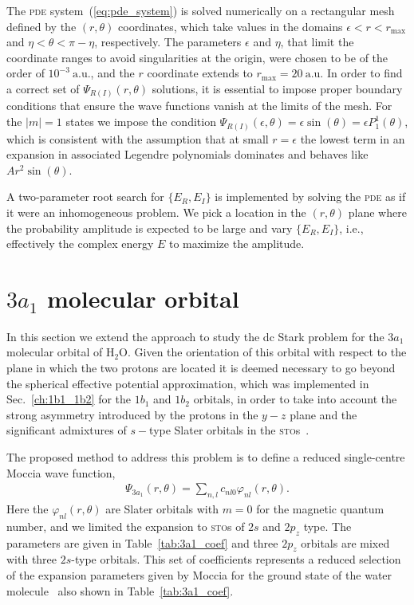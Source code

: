 The \textsc{pde} system~(\ref{eq:pde_system}) is solved numerically on
a rectangular mesh defined by the $(r, \theta)$ coordinates, which
take values in the domains $\epsilon < r < r_{\mathrm{max}}$ and $\eta
< \theta < \pi - \eta$, respectively. The parameters $\epsilon$ and
$\eta$, that limit the coordinate ranges to avoid singularities at the
origin, were chosen to be of the order of $10^{-3}\ \mathrm{a.u.}$,
and the $r$ coordinate extends to $r_{\mathrm{max}} =
20\ \mathrm{a.u.}$ In order to find a correct set of
$\Psi_{R(I)}(r,\theta)$ solutions, it is essential to impose proper
boundary conditions that ensure the wave functions vanish at the
limits of the mesh. For the $|m| = 1$ states we impose the condition
$\Psi_{R(I)}(\epsilon,\theta) = \epsilon \sin(\theta) = \epsilon
P_{1}^{1}(\theta)$, which is consistent with the assumption that at
small $r = \epsilon$ the lowest term in an expansion in associated
Legendre polynomials dominates and behaves like $A r^{2}
\sin(\theta)$.

A two-parameter root search for $\{E_{R}, E_{I}\}$ is implemented by
solving the \textsc{pde} as if it were an inhomogeneous problem. We
pick a location in the $(r,\theta)$ plane where the probability
amplitude is expected to be large and vary $\{E_{R}, E_{I}\}$, i.e.,
effectively the complex energy $E$ to maximize the amplitude.


\section{$3a_{1}$ molecular orbital}
\label{ch:3a1}

In this section we extend the approach to study the dc Stark problem
for the $3a_{1}$ molecular orbital of H$_{2}$O. Given the orientation
of this orbital with respect to the plane in which the two protons are
located it is deemed necessary to go beyond the spherical effective
potential approximation, which was implemented in
Sec.~\ref{ch:1b1_1b2} for the $1b_{1}$ and $1b_{2}$ orbitals, in order
to take into account the strong asymmetry introduced by the protons in
the $y-z$ plane and the significant admixtures of $s-$type Slater
orbitals in the \textsc{sto}s~\cite{Moccia_1964}.

The proposed method to address this problem is to define a reduced
single-centre Moccia wave function,
%
\begin{eqnarray}
\Psi_{3a_{1}}(r,\theta) = \sum_{n,l} c_{nl0} \varphi_{nl}(r,\theta).
\label{eq:3a1Moccia_expansion}
\end{eqnarray}
%
Here the $\varphi_{nl}(r,\theta)$ are Slater orbitals with $m=0$ for
the magnetic quantum number, and we limited the expansion to
\textsc{sto}s of $2s$ and $2p_{z}$ type. The parameters are given in
Table~\ref{tab:3a1_coef} and three $2p_{z}$ orbitals are mixed with
three $2s$-type orbitals. This set of coefficients represents a
reduced selection of the expansion parameters given by Moccia for the
ground state of the water molecule~\cite{Moccia_1964} also shown in
Table~\ref{tab:3a1_coef}.

